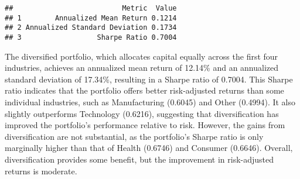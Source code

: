 \documentclass[
]{article}
\newenvironment{Shaded}{\begin{snugshade}}{\end{snugshade}}
\newcommand{\AttributeTok}[1]{\textcolor[rgb]{0.13,0.29,0.53}{#1}}
\newcommand{\FunctionTok}[1]{\textcolor[rgb]{0.13,0.29,0.53}{\textbf{#1}}}
\newcommand{\NormalTok}[1]{#1}
\newcommand{\OtherTok}[1]{\textcolor[rgb]{0.56,0.35,0.01}{#1}}
\newcommand{\SpecialCharTok}[1]{\textcolor[rgb]{0.81,0.36,0.00}{\textbf{#1}}}
\newcommand{\StringTok}[1]{\textcolor[rgb]{0.31,0.60,0.02}{#1}}
\begin{document}
\begin{verbatim}
##                          Metric  Value
## 1        Annualized Mean Return 0.1214
## 2 Annualized Standard Deviation 0.1734
## 3                  Sharpe Ratio 0.7004
\end{verbatim}

The diversified portfolio, which allocates capital equally across the
first four industries, achieves an annualized mean return of 12.14\% and
an annualized standard deviation of 17.34\%, resulting in a Sharpe ratio
of 0.7004. This Sharpe ratio indicates that the portfolio offers better
risk-adjusted returns than some individual industries, such as
Manufacturing (0.6045) and Other (0.4994). It also slightly outperforms
Technology (0.6216), suggesting that diversification has improved the
portfolio's performance relative to risk. However, the gains from
diversification are not substantial, as the portfolio's Sharpe ratio is
only marginally higher than that of Health (0.6746) and Consumer
(0.6646). Overall, diversification provides some benefit, but the
improvement in risk-adjusted returns is moderate.

\begin{Shaded}
\end{Shaded}
\end{document}
